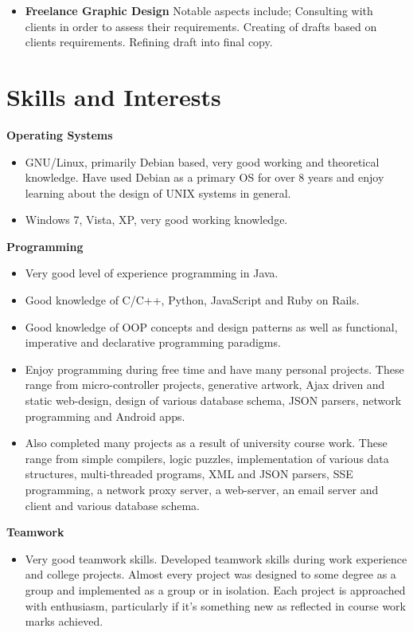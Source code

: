 \documentclass{res}
\begin{document}
\begin{resume}
\begin{itemize}
    \item{{\bf Freelance Graphic Design}} Notable aspects include; Consulting with clients in order to assess their requirements. Creating of drafts based on clients requirements. Refining draft into final copy.
  \end{itemize}
    
 


     
\section{Skills and Interests} 
\renewcommand{\labelitemi}{$\bullet$}
\vspace{0.1in}
 {\bf Operating Systems}
    \begin{itemize} %
      \item GNU/Linux, primarily Debian based, very good working and theoretical knowledge. Have used Debian as a primary OS for over 8 years and enjoy learning about the design of UNIX systems in general.
      \item Windows 7, Vista, XP, very good working knowledge.
      \end{itemize}
{\bf Programming} 
       \begin{itemize}
        \item Very good level of experience programming in Java. 
        \item Good knowledge of C/C++, Python, JavaScript and Ruby on Rails. 
        \item Good knowledge of OOP concepts and design patterns as well as functional, imperative and declarative programming paradigms. 
        \item Enjoy programming during free time and have many personal projects. These range from micro-controller projects, generative artwork, Ajax driven and static web-design, design of various database schema, JSON parsers, network programming and Android apps.
        \item Also completed many projects as a result of university course work. These range from simple compilers, logic puzzles, implementation of various data structures, multi-threaded programs, XML and JSON parsers, SSE programming, a network proxy server, a web-server, an email server and client and various database schema.
    \end{itemize}

    {\bf  Teamwork} 
        \begin{itemize}
        \item  Very good teamwork skills. Developed teamwork skills during work experience and college projects. Almost every project was designed to some degree as a group and implemented as a group or in isolation. Each project is approached with enthusiasm, particularly if it's something new as reflected in course work marks achieved.
       \end{itemize} 


\end{resume}
\end{document}
